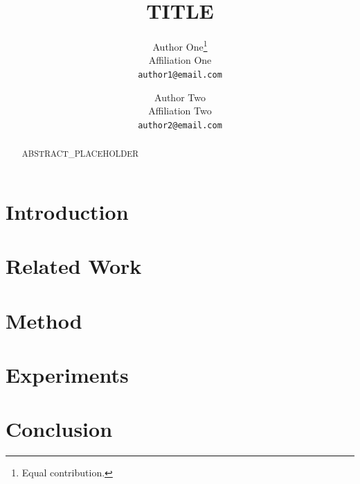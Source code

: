 \documentclass[11pt]{article}
\title{\textbf{TITLE}}
\author{
  Author One\thanks{Equal contribution.} \\
  Affiliation One \\
  \texttt{author1@email.com}
  \and
  Author Two\footnotemark[1] \\
  Affiliation Two \\
  \texttt{author2@email.com}
}
\date{}
\begin{document}
\maketitle

\begin{abstract}
ABSTRACT\_PLACEHOLDER
\end{abstract}

\section{Introduction}
\label{sec:intro}



\section{Related Work}
\label{sec:related}



\section{Method}
\label{sec:method}



\section{Experiments}
\label{sec:experiments}



\section{Conclusion}
\label{sec:conclusion}





\end{document}

